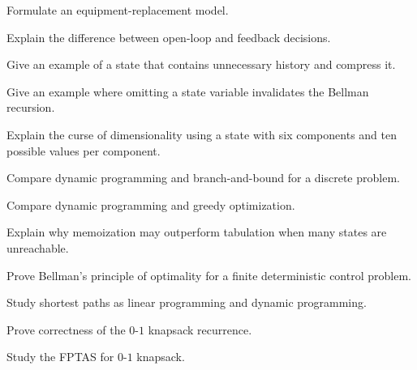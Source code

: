 \begin{exercise}[3]
Formulate an equipment-replacement model.
\end{exercise}

\begin{exercise}[3]
Explain the difference between open-loop and feedback decisions.
\end{exercise}

\begin{exercise}[3]
Give an example of a state that contains unnecessary history and compress
it.
\end{exercise}

\begin{exercise}[3]
Give an example where omitting a state variable invalidates the Bellman
recursion.
\end{exercise}

\begin{exercise}[3]
Explain the curse of dimensionality using a state with six components and
ten possible values per component.
\end{exercise}

\begin{exercise}[3]
Compare dynamic programming and branch-and-bound for a discrete problem.
\end{exercise}

\begin{exercise}[3]
Compare dynamic programming and greedy optimization.
\end{exercise}

\begin{exercise}[3]
Explain why memoization may outperform tabulation when many states are
unreachable.
\end{exercise}

\begin{exercise}[4]
Prove Bellman's principle of optimality for a finite deterministic control
problem.
\end{exercise}

\begin{exercise}[4]
Study shortest paths as linear programming and dynamic programming.
\end{exercise}

\begin{exercise}[4]
Prove correctness of the \(0\)-\(1\) knapsack recurrence.
\end{exercise}

\begin{exercise}[4]
Study the FPTAS for \(0\)-\(1\) knapsack.
\end{exercise}

